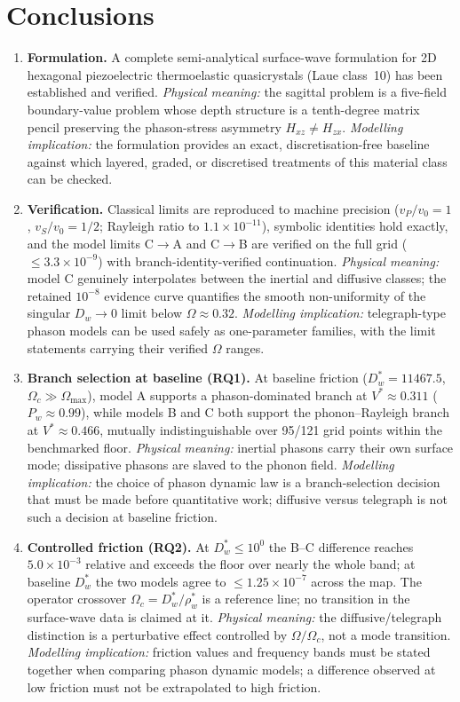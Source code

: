 \documentclass[11pt]{article}
\newcommand{\Om}{\Omega}
\newcommand{\Dw}{D_w}
\newcommand{\rw}{\rho_w}
\begin{document}
\section{Conclusions}

\begin{enumerate}
\item \textbf{Formulation.} A complete semi-analytical surface-wave formulation for 2D hexagonal piezoelectric thermoelastic quasicrystals (Laue class~10) has been established and verified. \emph{Physical meaning:} the sagittal problem is a five-field boundary-value problem whose depth structure is a tenth-degree matrix pencil preserving the phason-stress asymmetry $H_{xz}\neq H_{zx}$. \emph{Modelling implication:} the formulation provides an exact, discretisation-free baseline against which layered, graded, or discretised treatments of this material class can be checked.
\item \textbf{Verification.} Classical limits are reproduced to machine precision ($v_P/v_0=1$, $v_S/v_0=1/2$; Rayleigh ratio to $1.1\times10^{-11}$), symbolic identities hold exactly, and the model limits C$\to$A and C$\to$B are verified on the full grid ($\le3.3\times10^{-9}$) with branch-identity-verified continuation. \emph{Physical meaning:} model C genuinely interpolates between the inertial and diffusive classes; the retained $10^{-8}$ evidence curve quantifies the smooth non-uniformity of the singular $\Dw\to0$ limit below $\Om\approx0.32$. \emph{Modelling implication:} telegraph-type phason models can be used safely as one-parameter families, with the limit statements carrying their verified $\Om$ ranges.
\item \textbf{Branch selection at baseline (RQ1).} At baseline friction ($D_w^*=11467.5$, $\Om_c\gg\Om_{\max}$), model A supports a phason-dominated branch at $V^*\approx0.311$ ($P_w\approx0.99$), while models B and C both support the phonon--Rayleigh branch at $V^*\approx0.466$, mutually indistinguishable over 95/121 grid points within the benchmarked floor. \emph{Physical meaning:} inertial phasons carry their own surface mode; dissipative phasons are slaved to the phonon field. \emph{Modelling implication:} the choice of phason dynamic law is a branch-selection decision that must be made before quantitative work; diffusive versus telegraph is not such a decision at baseline friction.
\item \textbf{Controlled friction (RQ2).} At $D_w^*\le10^{0}$ the B--C difference reaches $5.0\times10^{-3}$ relative and exceeds the floor over nearly the whole band; at baseline $D_w^*$ the two models agree to $\le1.25\times10^{-7}$ across the map. The operator crossover $\Om_c=D_w^*/\rw^*$ is a reference line; no transition in the surface-wave data is claimed at it. \emph{Physical meaning:} the diffusive/telegraph distinction is a perturbative effect controlled by $\Om/\Om_c$, not a mode transition. \emph{Modelling implication:} friction values and frequency bands must be stated together when comparing phason dynamic models; a difference observed at low friction must not be extrapolated to high friction.

\end{enumerate}
\end{document}
